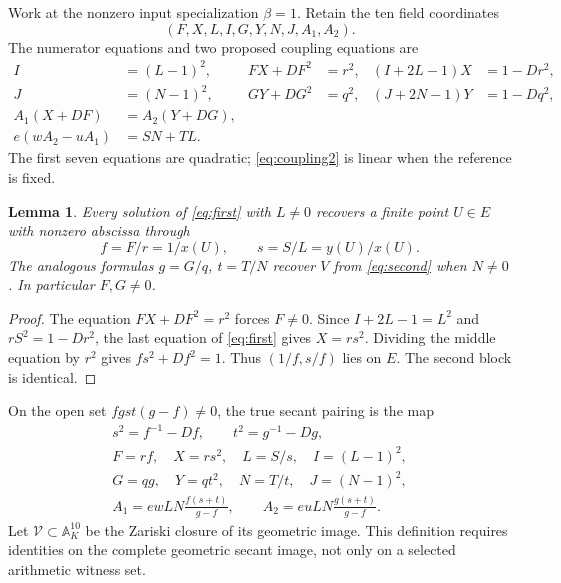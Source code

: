 \documentclass[11pt,a4paper]{article}
\newtheorem{lemma}[theorem]{Lemma}
\newcommand{\A}{\mathbb A}\newcommand{\calV}{\mathcal V}
\begin{document}
Work at the nonzero input specialization $\beta=1$. Retain the ten
field coordinates
\[
                     (F,X,L,I,G,Y,N,J,A_1,A_2).
\]
The numerator equations and two proposed coupling equations are
\begin{align}
 I&=(L-1)^2,& FX+DF^2&=r^2,&(I+2L-1)X&=1-Dr^2,
                                                        \label{eq:first}\\
 J&=(N-1)^2,& GY+DG^2&=q^2,&(J+2N-1)Y&=1-Dq^2,
                                                        \label{eq:second}\\
 A_1(X+DF)&=A_2(Y+DG),&&&\label{eq:coupling1}\\
 e(wA_2-uA_1)&=SN+TL.&&&\label{eq:coupling2}
\end{align}
The first seven equations are quadratic; \eqref{eq:coupling2} is
linear when the reference is fixed.

\begin{lemma}\label{lem:recovery}
Every solution of \eqref{eq:first} with $L\ne0$ recovers a finite
point $U\in E$ with nonzero abscissa through
\[
 f=F/r=1/x(U),\qquad s=S/L=y(U)/x(U).
\]
The analogous formulas $g=G/q$, $t=T/N$ recover $V$ from
\eqref{eq:second} when $N\ne0$. In particular $F,G\ne0$.
\end{lemma}
\begin{proof}
The equation $FX+DF^2=r^2$ forces $F\ne0$. Since
$I+2L-1=L^2$ and $rS^2=1-Dr^2$, the last equation of
\eqref{eq:first} gives $X=rs^2$. Dividing the middle equation
by $r^2$ gives $fs^2+Df^2=1$. Thus $(1/f,s/f)$ lies on $E$.
The second block is identical.
\end{proof}

On the open set $fgst(g-f)\ne0$, the true secant pairing is the map
\begin{equation}\label{eq:map}
\begin{gathered}
 s^2=f^{-1}-Df,\qquad t^2=g^{-1}-Dg,\\
 F=rf,\quad X=rs^2,\quad L=S/s,\quad I=(L-1)^2,\\
 G=qg,\quad Y=qt^2,\quad N=T/t,\quad J=(N-1)^2,\\
 A_1=ewLN\frac{f(s+t)}{g-f},\qquad
 A_2=euLN\frac{g(s+t)}{g-f}.
\end{gathered}
\end{equation}
Let $\calV\subset\A_K^{10}$ be the Zariski closure of its geometric
image. This definition requires identities on the complete geometric
secant image, not only on a selected arithmetic witness set.
\end{document}
